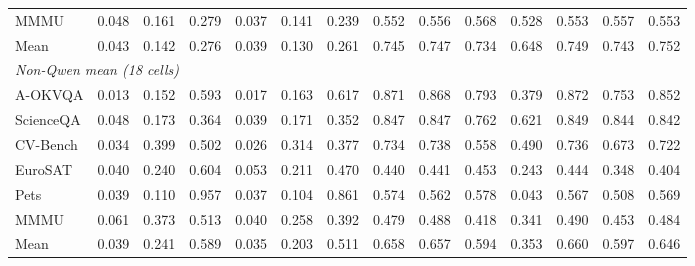 \begin{tabular}{@{}lrrrrrr rrrr rrr@{}}
MMMU & 0.048 & 0.161 & 0.279 & 0.037 & 0.141 & 0.239 & 0.552 & 0.556 & 0.568 & 0.528 & 0.553 & 0.557 & 0.553 \\
Mean & 0.043 & 0.142 & 0.276 & 0.039 & 0.130 & 0.261 & 0.745 & 0.747 & 0.734 & 0.648 & 0.749 & 0.743 & 0.752 \\
\midrule
\multicolumn{14}{l}{\textit{Non-Qwen mean (18 cells)}}\\
A-OKVQA & 0.013 & 0.152 & 0.593 & 0.017 & 0.163 & 0.617 & 0.871 & 0.868 & 0.793 & 0.379 & 0.872 & 0.753 & 0.852 \\
ScienceQA & 0.048 & 0.173 & 0.364 & 0.039 & 0.171 & 0.352 & 0.847 & 0.847 & 0.762 & 0.621 & 0.849 & 0.844 & 0.842 \\
CV-Bench & 0.034 & 0.399 & 0.502 & 0.026 & 0.314 & 0.377 & 0.734 & 0.738 & 0.558 & 0.490 & 0.736 & 0.673 & 0.722 \\
EuroSAT & 0.040 & 0.240 & 0.604 & 0.053 & 0.211 & 0.470 & 0.440 & 0.441 & 0.453 & 0.243 & 0.444 & 0.348 & 0.404 \\
Pets & 0.039 & 0.110 & 0.957 & 0.037 & 0.104 & 0.861 & 0.574 & 0.562 & 0.578 & 0.043 & 0.567 & 0.508 & 0.569 \\
MMMU & 0.061 & 0.373 & 0.513 & 0.040 & 0.258 & 0.392 & 0.479 & 0.488 & 0.418 & 0.341 & 0.490 & 0.453 & 0.484 \\
Mean & 0.039 & 0.241 & 0.589 & 0.035 & 0.203 & 0.511 & 0.658 & 0.657 & 0.594 & 0.353 & 0.660 & 0.597 & 0.646 \\
\bottomrule
\end{tabular}

